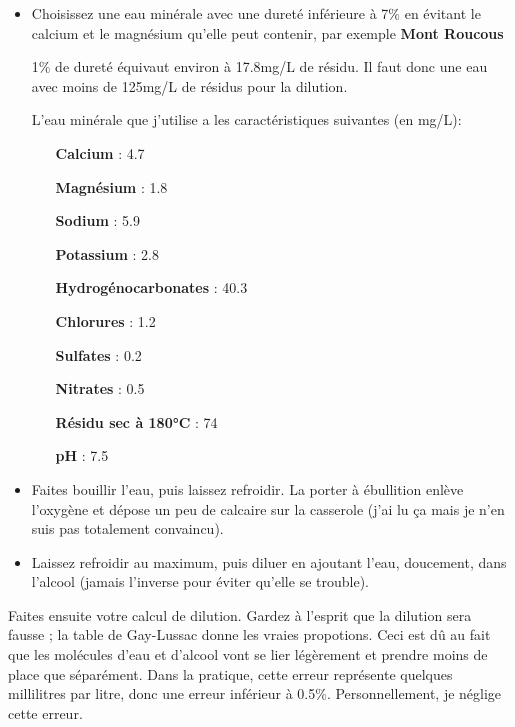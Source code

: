 \documentclass[a4paper,twoside,openright]{report}
\begin{document}
\begin{itemize}
\item Choisissez une eau minérale avec une dureté inférieure à 7\% en évitant le calcium et le magnésium qu'elle peut contenir, par exemple \textbf{Mont Roucous}
\begin{remarque}
1\% de dureté équivaut environ à 17.8mg/L de résidu. Il faut donc une eau avec moins de 125mg/L de résidus pour la dilution.
\end{remarque}
L'eau minérale que j'utilise a les caractéristiques suivantes (en mg/L):
\begin{itemize}
\item[\textbf{Calcium}] :  4.7
\item[\textbf{Magnésium}] :  1.8
\item[\textbf{Sodium}] : 5.9
\item[\textbf{Potassium}] : 2.8
\item[\textbf{Hydrogénocarbonates}] : 40.3
\item[\textbf{Chlorures}] : 1.2
\item[\textbf{Sulfates}] : 0.2
\item[\textbf{Nitrates}] : 0.5
\item[\textbf{Résidu sec à 180°C}] : 74
\item[\textbf{pH}] : 7.5
\end{itemize}
\item Faites bouillir l'eau, puis laissez refroidir. La porter à ébullition enlève l'oxygène et dépose un peu de calcaire sur la casserole (j'ai lu ça mais je n'en suis pas totalement convaincu).
\item Laissez refroidir au maximum, puis diluer en ajoutant l'eau, doucement, dans l'alcool (jamais l'inverse pour éviter qu'elle se trouble). %
\end{itemize}

Faites ensuite votre calcul de dilution. Gardez à l'esprit que la dilution sera fausse ; la table de Gay-Lussac donne les vraies propotions. Ceci est dû au fait que les molécules d'eau et d'alcool vont se lier légèrement et prendre moins de place que séparément. Dans la pratique, cette erreur représente quelques millilitres par litre, donc une erreur inférieur à 0.5\%. Personnellement, je néglige cette erreur.
\end{document}
